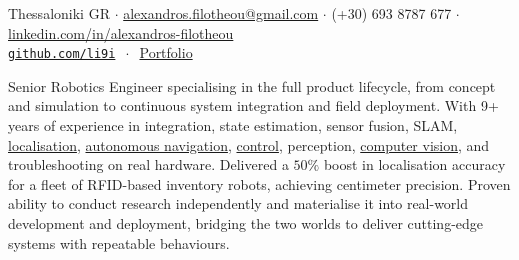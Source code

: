 \documentclass[a4paper,10pt,twoside]{article}
\begin{document}

\par{\bigskip\par}

\begin{center}
\vspace{-0.5em}
  {\small Thessaloniki GR $\cdot$ \href{mailto:alexandros.filotheou@gmail.com}{alexandros.filotheou@gmail.com} $\cdot$ (+30) 693 8787 677 $\cdot$ \href{https://www.linkedin.com/in/alexandros-filotheou-5b6a8676/}{linkedin.com/in/alexandros-filotheou} \\
  \href{https://github.com/li9i/}{\texttt{github.com/li9i}} $\ \cdot\ $ \href{https://mozilla.github.io/pdf.js/web/viewer.html?file=https://raw.githubusercontent.com/li9i/portfolio/master/portfolio.pdf}{Portfolio}}
\end{center}\vspace{2em}

\vspace{-3em}
\begin{bw_box} \small
Senior Robotics Engineer specialising in the full product lifecycle, from concept and simulation to continuous system integration and field deployment. With 9+ years of experience in integration, state estimation, sensor fusion, SLAM, \href{https://github.com/li9i/fsm-lo}{localisation}, \href{https://link.springer.com/article/10.1007/s10846-019-01086-y}{autonomous navigation}, \href{https://www.tandfonline.com/doi/full/10.1080/00207179.2018.1514129}{control}, perception, \href{https://github.com/li9i/pandora\_vision\_2014}{computer vision}, and troubleshooting on real hardware. Delivered a $50\%$ boost in localisation accuracy for a fleet of RFID-based inventory robots, achieving centimeter precision. Proven ability to conduct research independently and materialise it into real-world development and deployment, bridging the two worlds to deliver cutting-edge systems with repeatable behaviours.
\end{bw_box}

\vfill

\end{document}
